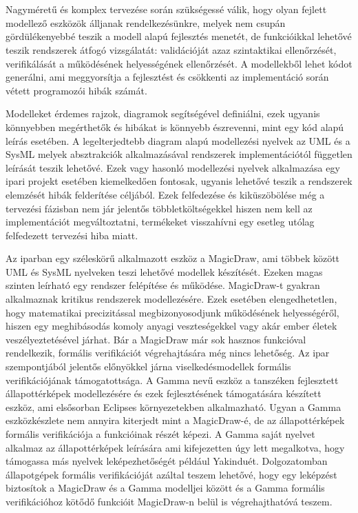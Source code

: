 \chapter{\bevezetes}


Nagyméretű és komplex tervezése során szükségessé válik, hogy olyan fejlett modellező eszközök álljanak rendelkezésünkre, melyek nem csupán gördülékenyebbé teszik a modell alapú fejlesztés menetét, de funkcióikkal lehetővé teszik rendszerek átfogó vizsgálatát: validációját azaz szintaktikai ellenőrzését, verifikálását a működésének helyességének ellenőrzését. A modellekből lehet kódot generálni, ami meggyorsítja a fejlesztést és csökkenti az implementáció során vétett programozói hibák számát.

Modelleket érdemes rajzok, diagramok segítségével definiálni, ezek ugyanis könnyebben megérthetők és hibákat is könnyebb észrevenni, mint egy kód alapú leírás esetében. A legelterjedtebb diagram alapú modellezési nyelvek az UML és a SysML melyek absztrakciók alkalmazásával rendszerek implementációtól független leírását teszik lehetővé. Ezek vagy hasonló modellezési nyelvek alkalmazása egy ipari projekt esetében kiemelkedően fontosak, ugyanis lehetővé teszik a rendszerek elemzését hibák felderítése céljából. Ezek felfedezése és kiküszöbölése még a tervezési fázisban nem jár jelentős többletköltségekkel hiszen nem kell az implementációt megváltoztatni, termékeket visszahívni egy esetleg utólag felfedezett tervezési hiba miatt.

Az iparban egy széleskörű alkalmazott eszköz a MagicDraw, ami többek között UML és SysML nyelveken teszi lehetővé modellek készítését. Ezeken magas szinten leírható egy rendszer felépítése és működése. MagicDraw-t gyakran alkalmaznak kritikus rendszerek modellezésére. Ezek esetében elengedhetetlen, hogy matematikai precizitással megbizonyosodjunk működésének helyességéről, hiszen egy meghibásodás komoly anyagi veszteségekkel vagy akár ember életek veszélyeztetésével járhat. Bár a MagicDraw már sok hasznos funkcióval rendelkezik, formális verifikációt végrehajtására még nincs lehetőség. Az ipar szempontjából jelentős előnyökkel járna viselkedésmodellek formális verifikációjának támogatottsága.
A Gamma nevű eszköz a tanszéken fejlesztett állapottérképek modellezésére és ezek fejlesztésének támogatására készített eszköz, ami elsősorban Eclipses környezetekben alkalmazható. Ugyan a Gamma eszközkészlete nem annyira kiterjedt mint a MagicDraw-é, de az állapottérképek formális verifikációja a funkcióinak részét képezi. A Gamma saját nyelvet alkalmaz az állapottérképek leírására ami kifejezetten úgy lett megalkotva, hogy támogassa más nyelvek leképezhetőségét például Yakinduét. Dolgozatomban állapotgépek formális verifikációját azáltal teszem lehetővé, hogy egy leképzést biztosítok a MagicDraw és a Gamma modelljei között és a Gamma formális verifikációhoz kötődő funkcióit MagicDraw-n belül is végrehajthatóvá teszem.

